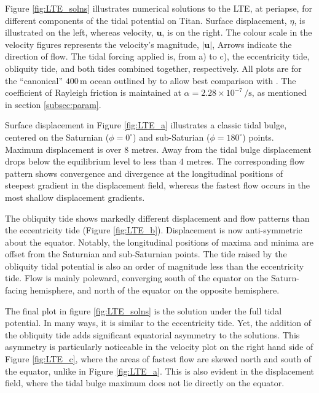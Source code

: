 Figure \ref{fig:LTE_solns} illustrates numerical solutions to the LTE, at periapse, for different components of the tidal potential on Titan. Surface displacement, $\eta$, is illustrated on the left, whereas velocity, $\bm{u}$, is on the right. The colour scale in the velocity figures represents the velocity's magnitude, $\left| \bm{u} \right|$, Arrows indicate the direction of flow. The tidal forcing applied is, from a) to c), the eccentricity tide, obliquity tide, and both tides combined together, respectively. All plots are for the ``canonical'' $400 \, \si{\metre}$ ocean outlined by \citet{sagan1982tide} to allow best comparison with \citet{sears1994tidal,sears1995tidal,sohl1995tidal}. The coefficient of Rayleigh friction is maintained at $\alpha = 2.28 \times 10^{-7} \, \si{\per\second}$, as mentioned in section \ref{subsec:param}.

Surface displacement in Figure \ref{fig:LTE_a} illustrates a classic tidal bulge, centered on the Saturnian ($\phi = 0^{\circ}$) and sub-Saturian ($\phi = 180^{\circ}$) points. Maximum displacement is over $8$ metres. Away from the tidal bulge displacement drops below the equilibrium level to less than $4$ metres. The corresponding flow pattern shows convergence and divergence at the longitudinal positions of steepest gradient in the displacement field, whereas the fastest flow occurs in the most shallow displacement gradients.

The obliquity tide shows markedly different displacement and flow patterns than the eccentricity tide (Figure \ref{fig:LTE_b}). Displacement is now anti-symmetric about the equator. Notably, the longitudinal positions of maxima and minima are offset from the Saturnian and sub-Saturnian points. The tide raised by the obliquity tidal potential is also an order of magnitude less than the eccentricity tide. Flow is mainly poleward, converging south of the equator on the Saturn-facing hemisphere, and north of the equator on the opposite hemisphere.

The final plot in figure \ref{fig:LTE_solns} is the solution under the full tidal potential. In many ways, it is similar to the eccentricity tide. Yet, the addition of the obliquity tide adds significant equatorial asymmetry to the solutions. This asymmetry is particularly noticeable in the velocity plot on the right hand side of Figure \ref{fig:LTE_c}, where the areas of fastest flow are skewed north and south of the equator, unlike in Figure \ref{fig:LTE_a}. This is also evident in the displacement field, where the tidal bulge maximum does not lie directly on the equator.

